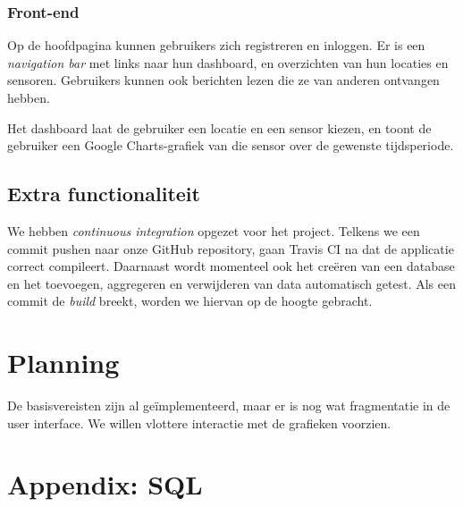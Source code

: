 \documentclass[12pt,draft,parskip=full]{article}
\begin{document}
\subsubsection{Front-end}
Op de hoofdpagina kunnen gebruikers zich registreren en inloggen. Er is een 
\textit{navigation bar} met links naar hun dashboard, en overzichten van hun 
locaties en sensoren. Gebruikers kunnen ook berichten lezen die ze van anderen 
ontvangen hebben.

Het dashboard laat de gebruiker een locatie en een sensor kiezen, en toont de 
gebruiker een Google Charts-grafiek van die sensor over de gewenste 
tijdsperiode.

\subsection{Extra functionaliteit}

We hebben
\emph{continuous integration} opgezet voor het project. Telkens we een {commit} 
pushen naar onze GitHub {repository}, gaan Travis CI na dat de applicatie correct compileert. Daarnaast wordt 
momenteel ook het cre\"eren van een database en het toevoegen, aggregeren en verwijderen van data automatisch getest. Als een commit de \textit{build} breekt, worden we hiervan op de hoogte gebracht.

\section{Planning}
De basisvereisten zijn al ge\"implementeerd, maar er is nog wat fragmentatie in 
de user interface. We willen vlottere interactie met de grafieken voorzien.

\pagebreak
{}
\section{Appendix: SQL}
\label{dbschema}
\lstset{language=SQL,basicstyle=\ttfamily}


\pagebreak
\restoregeometry
\def\arraystretch{1.8}
\newcommand{\argu}[1]{\textbf{<\textit{#1}>}}
\newcommand{\getallDesc}[1]{Toont een JSON-lijst van alle \code{#1} records.}
\newcommand{\getDesc}[1]{Toont de \code{#1} met de gegeven ID.}
\newcommand{\insertDesc}[1]{Leest een \code{#1{}Data} JSON-object uit de
  request body, en maakt een nieuwe \code{#1} aan in de database.}
\newcommand{\deleteDesc}[1]{Verwijdert de \code{#1} met
  de gegeven ID uit de database.}
\newcommand{\crud}[3]{
  \code{GET /api/{#1}} & \getallDesc{#2} \\
  \code{GET /api/{#1}/\argu{#3}} & \getDesc{#2} \\
  \code{POST /api/{#1}} & \insertDesc{#2} \\
  \code{DELETE /api/{#1}/\argu{#3}} & \deleteDesc{#2}
}
\end{document}
